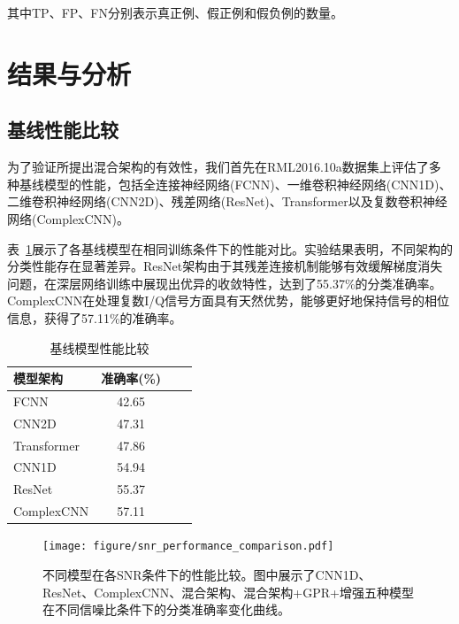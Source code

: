\documentclass[conference]{IEEEtran}
\begin{document}
其中TP、FP、FN分别表示真正例、假正例和假负例的数量。


\section{结果与分析}

\subsection{基线性能比较}

为了验证所提出混合架构的有效性，我们首先在RML2016.10a数据集上评估了多种基线模型的性能，包括全连接神经网络(FCNN)、一维卷积神经网络(CNN1D)、二维卷积神经网络(CNN2D)、残差网络(ResNet)、Transformer以及复数卷积神经网络(ComplexCNN)。

表~\ref{tab:baseline_comparison}展示了各基线模型在相同训练条件下的性能对比。实验结果表明，不同架构的分类性能存在显著差异。ResNet架构由于其残差连接机制能够有效缓解梯度消失问题，在深层网络训练中展现出优异的收敛特性，达到了55.37\%的分类准确率。ComplexCNN在处理复数I/Q信号方面具有天然优势，能够更好地保持信号的相位信息，获得了57.11\%的准确率。

\begin{table}[h]
\centering
\caption{基线模型性能比较}
\label{tab:baseline_comparison}
\begin{tabular}{@{}lccc@{}}
\toprule
模型架构 & 准确率(\%) \\
\midrule
FCNN & 42.65 \\
CNN2D & 47.31 \\
Transformer & 47.86 \\
CNN1D & 54.94 \\
ResNet & 55.37 \\
ComplexCNN & 57.11 \\
\bottomrule
\end{tabular}
\end{table}

\begin{figure}[htbp]
\centering
\texttt{[image: figure/snr\_performance\_comparison.pdf]}
\caption{不同模型在各SNR条件下的性能比较。图中展示了CNN1D、ResNet、ComplexCNN、混合架构、混合架构+GPR+增强五种模型在不同信噪比条件下的分类准确率变化曲线。}
\label{fig:snr_performance}
\end{figure}

\end{document}
